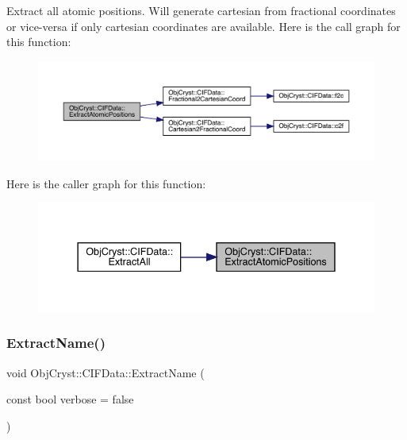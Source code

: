 Extract all atomic positions. Will generate cartesian from fractional coordinates or vice-\/versa if only cartesian coordinates are available. Here is the call graph for this function\+:
\nopagebreak
\begin{figure}[H]
\begin{center}
\leavevmode
\includegraphics[width=350pt]{class_obj_cryst_1_1_c_i_f_data_ada558a6f28454cae868aef9710a785d7_cgraph}
\end{center}
\end{figure}
Here is the caller graph for this function\+:
\nopagebreak
\begin{figure}[H]
\begin{center}
\leavevmode
\includegraphics[width=337pt]{class_obj_cryst_1_1_c_i_f_data_ada558a6f28454cae868aef9710a785d7_icgraph}
\end{center}
\end{figure}
\mbox{\label{class_obj_cryst_1_1_c_i_f_data_a57e9ec3f37cfe8c272cc102280f08d66}} 
\subsubsection{\texorpdfstring{ExtractName()}{ExtractName()}}
{\footnotesize\ttfamily void Obj\+Cryst\+::\+C\+I\+F\+Data\+::\+Extract\+Name (\begin{DoxyParamCaption}\item[{const bool}]{verbose = {\ttfamily false} }\end{DoxyParamCaption})}



